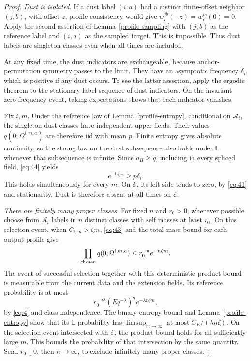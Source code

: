 \begin{proof}
\emph{Dust is isolated.}
If a dust label \((i,a)\) had a distinct finite-offset neighbor
\((j,b)\), with offset \(z\), profile consistency would give
\(w_i^{jb}(-z)=w_i^{ia}(0)=0\). Apply the second assertion of
Lemma~\ref{profile-sampling} with \((j,b)\) as the reference label
and \((i,a)\) as the sampled target. This is impossible. Thus dust
labels are singleton classes even when all times are included.

At any fixed time, the dust indicators are exchangeable, because
anchor-permutation symmetry passes to the limit. They have an
asymptotic frequency \(\delta_i\), which is positive if any dust occurs. To see
the latter assertion, apply the ergodic theorem to the stationary
label sequence of dust indicators. On the invariant zero-frequency
event, taking expectations shows that each indicator vanishes.

Fix \(i,m\). Under the reference law of Lemma~\ref{profile-entropy},
conditional on \(\mathcal A_i\), the singleton dust classes have
independent upper fields. Their values \(q(0;\Omega^{i,m,a})\) are
therefore iid with mean \(p\). Finite entropy gives absolute
continuity, so the strong law on the dust subsequence also holds under
\(\mathbb L\) whenever that subsequence is infinite. Since
\(a_H\ge q\), including in every spliced field, \eqref{eq:44} yields
\[
e^{-C_{i,m}}\ge p\delta_i.
\]
This holds simultaneously for every \(m\). On \(\mathcal E\), its
left side tends to zero, by \eqref{eq:41} and stationarity. Dust is
therefore absent at all times on \(\mathcal E\).

\emph{There are finitely many proper classes.}
For fixed \(n\) and \(r_0>0\), whenever possible choose from
\(\mathcal A_i\) labels in \(n\) distinct classes with self masses
at least \(r_0\). On this selection event, when
\(C_{i,m}>\zeta m\), \eqref{eq:43} and the total-mass bound for
each output profile give
\[
\prod_{\rm chosen} q(0;\Omega^{i,m,a})\le r_0^{-n}e^{-n\zeta m}.
\]
The event of successful selection together with this deterministic
product bound is measurable from the current data and the extension
fields. Its reference probability is at most
\[
r_0^{-n\lambda}(E q^{-\lambda})^n e^{-\lambda n\zeta m},
\]
by \eqref{eq:4} and class independence. The binary entropy bound and
Lemma~\ref{profile-entropy} show that its \(\mathbb L\)-probability
has \(\limsup_{m\to\infty}\) at most \(C_E/(\lambda n\zeta)\).
On the selection event intersected with \(\mathcal E\), the product
bound holds for all sufficiently large \(m\). This bounds the
probability of that intersection by the same quantity. Send
\(r_0\downarrow0\), then \(n\to\infty\), to exclude infinitely
many proper classes.


\end{proof}
